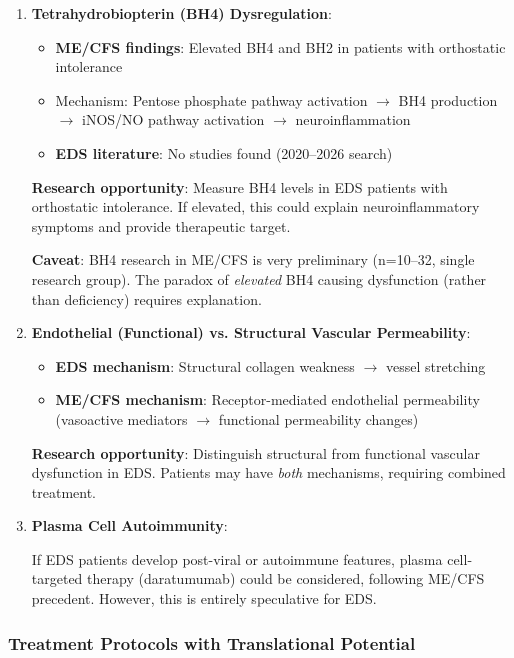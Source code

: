 \begin{enumerate}
    \item \textbf{Tetrahydrobiopterin (BH4) Dysregulation}:

    \begin{itemize}
        \item \textbf{ME/CFS findings}: Elevated BH4 and BH2 in patients with orthostatic intolerance~\cite{Gottschalk2023,Bulbule2024}
        \item Mechanism: Pentose phosphate pathway activation $\rightarrow$ BH4 production $\rightarrow$ iNOS/NO pathway activation $\rightarrow$ neuroinflammation
        \item \textbf{EDS literature}: No studies found (2020--2026 search)
    \end{itemize}

    \textbf{Research opportunity}: Measure BH4 levels in EDS patients with orthostatic intolerance. If elevated, this could explain neuroinflammatory symptoms and provide therapeutic target.

    \textbf{Caveat}: BH4 research in ME/CFS is very preliminary (n=10--32, single research group). The paradox of \textit{elevated} BH4 causing dysfunction (rather than deficiency) requires explanation.

    \item \textbf{Endothelial (Functional) vs. Structural Vascular Permeability}:

    \begin{itemize}
        \item \textbf{EDS mechanism}: Structural collagen weakness $\rightarrow$ vessel stretching
        \item \textbf{ME/CFS mechanism}: Receptor-mediated endothelial permeability (vasoactive mediators $\rightarrow$ functional permeability changes)
    \end{itemize}

    \textbf{Research opportunity}: Distinguish structural from functional vascular dysfunction in EDS. Patients may have \textit{both} mechanisms, requiring combined treatment.

    \item \textbf{Plasma Cell Autoimmunity}:

    If EDS patients develop post-viral or autoimmune features, plasma cell-targeted therapy (daratumumab) could be considered, following ME/CFS precedent. However, this is entirely speculative for EDS.
\end{enumerate}

\subsubsection{Treatment Protocols with Translational Potential}


